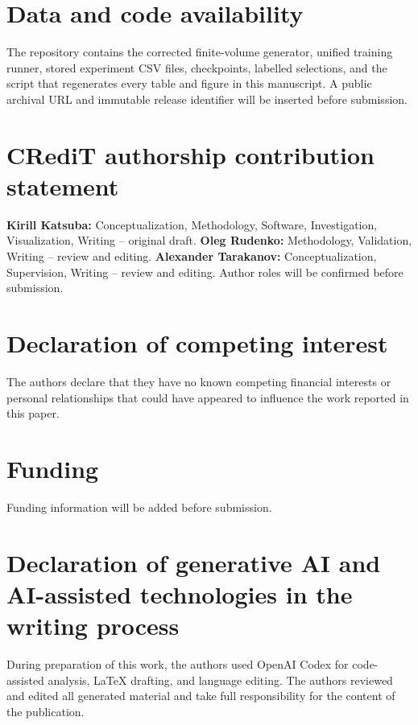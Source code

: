 \documentclass[final,5p,times,twocolumn]{elsarticle}
\begin{document}









\FloatBarrier
\appendix


\section*{Data and code availability}
The repository contains the corrected finite-volume generator, unified training runner, stored experiment CSV files, checkpoints, labelled selections, and the script that regenerates every table and figure in this manuscript. A public archival URL and immutable release identifier will be inserted before submission.

\section*{CRediT authorship contribution statement}
\textbf{Kirill Katsuba:} Conceptualization, Methodology, Software, Investigation, Visualization, Writing -- original draft. \textbf{Oleg Rudenko:} Methodology, Validation, Writing -- review and editing. \textbf{Alexander Tarakanov:} Conceptualization, Supervision, Writing -- review and editing. Author roles will be confirmed before submission.

\section*{Declaration of competing interest}
The authors declare that they have no known competing financial interests or personal relationships that could have appeared to influence the work reported in this paper.

\section*{Funding}
Funding information will be added before submission.

\section*{Declaration of generative AI and AI-assisted technologies in the writing process}
During preparation of this work, the authors used OpenAI Codex for code-assisted analysis, LaTeX drafting, and language editing. The authors reviewed and edited all generated material and take full responsibility for the content of the publication.


\renewcommand{\bibfont}{\small}

\end{document}
